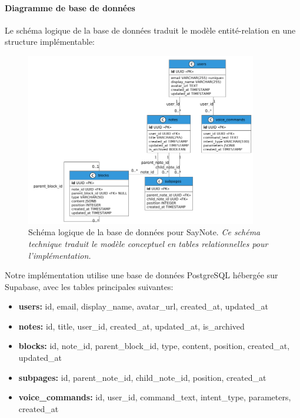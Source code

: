     \paragraph{Diagramme de base de données}
    
    Le schéma logique de la base de données traduit le modèle entité-relation en une structure implémentable:
    
        \begin{figure}[htbp]
        \centering
        \includegraphics[width=0.9\textwidth]{assets/docs/SayNote_db_schema.png}
        \caption{Schéma logique de la base de données pour SayNote. \newline\textit{Ce schéma technique traduit le modèle conceptuel en tables relationnelles pour l'implémentation.}}
        \label{fig:db_schema}
    \end{figure}
    
    Notre implémentation utilise une base de données PostgreSQL hébergée sur Supabase, avec les tables principales suivantes:
    
    \begin{itemize}
        \item \textbf{users:} id, email, display\_name, avatar\_url, created\_at, updated\_at
        
        \item \textbf{notes:} id, title, user\_id, created\_at, updated\_at, is\_archived
        
        \item \textbf{blocks:} id, note\_id, parent\_block\_id, type, content, position, created\_at, updated\_at
        
        \item \textbf{subpages:} id, parent\_note\_id, child\_note\_id, position, created\_at
        
        \item \textbf{voice\_commands:} id, user\_id, command\_text, intent\_type, parameters, created\_at
    \end{itemize}
    
    